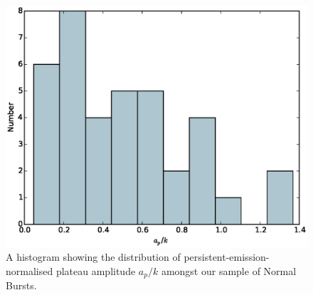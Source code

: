 \begin{figure}
  \centering
  \includegraphics[width=.9\linewidth, trim={0cm 0 0cm 0},clip]{images/appendix_plat_pa_n_hist.eps}
  \caption[Histogram showing the distribution of $a_p/k$ amongst Normal Bursts.]{A histogram showing the distribution of persistent-emission-normalised plateau amplitude $a_p/k$ amongst our sample of Normal Bursts.}
  \label{fig:app_hist_ap_n}
\end{figure}